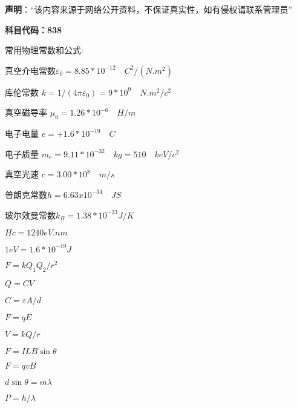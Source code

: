 
\textbf{声明}：“该内容来源于网络公开资料，不保证真实性，如有侵权请联系管理员”


\textbf{科目代码：838}

常用物理常数和公式:

真空介电常数$\varepsilon_0=8.85 *10^{-12} \quad C^2/(N.m^2)$

库伦常数 $k=1/(4\pi \varepsilon_0)=9*10^9 \quad N.m^2/c^2$

真空磁导率 $\mu_0=1.26*10^{-6}\quad H/m$

电子电量 $e=+1.6*10^{-19}\quad C$

电子质量 $m_e=9.11*10^{-32}\quad kg=510 \quad keV/c^2$

真空光速 $c=3.00* 10^8 \quad m/s$

普朗克常数$h=6.63x10^{-34}\quad JS$

玻尔效曼常数$k_B =1.38*10^{-23}J/K$

$Hc=1240 eV.nm$

$1 eV=1.6*10^{-19}J$

$F=k Q_1 Q_2/r^2$

$Q=CV$

$C=\varepsilon A/d$

$F=qE$

$V=kQ/r$

$F=ILB\sin \theta$

$F=qvB$

$d\sin \theta =m\lambda $

$P=h/\lambda$

